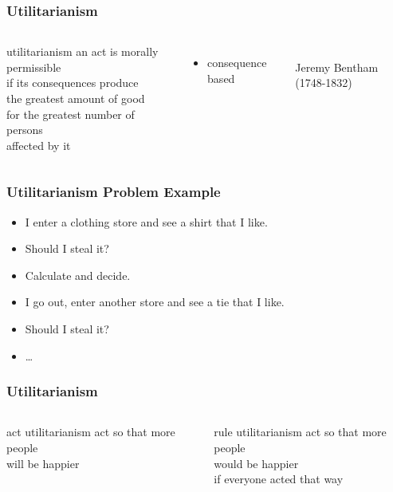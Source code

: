 \documentclass[dvipsnames]{beamer}
\theoremstyle{plain}
\begin{document}
\begin{frame}
  \frametitle{Utilitarianism}

  \begin{columns}
    \begin{block}{utilitarianism}
      an act is morally permissible\\
      if its consequences produce\\
      the greatest amount of good\\
      for the greatest number of persons\\
      affected by it
    \end{block}

    \begin{itemize}
      \item consequence based
    \end{itemize}

    \begin{center}
      \\
      Jeremy Bentham (1748-1832)
    \end{center}
  \end{columns}
\end{frame}

\begin{frame}
  \frametitle{Utilitarianism Problem Example}

  \begin{itemize}
    \item I enter a clothing store and see a shirt that I like.
    \item Should I steal it?
    \item Calculate and decide.

    \pause
    \bigskip
    \item I go out, enter another store and see a tie that I like.
    \item Should I steal it?
    \item \ldots
  \end{itemize}
\end{frame}

\begin{frame}
  \frametitle{Utilitarianism}

  \begin{columns}[t]
    \begin{block}{act utilitarianism}
      act so that more people\\
      will be happier
    \end{block}

    \pause
    \begin{block}{rule utilitarianism}
      act so that more people\\
      would be happier\\
      if everyone acted that way
    \end{block}
  \end{columns}
\end{frame}
\end{document}
